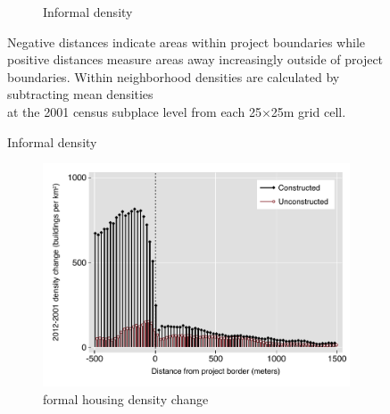 \documentclass[12pt]{article}
\begin{document}
\begin{figure}[h!]
\begin{subfigure}[b]{0.495\textwidth}
            \caption[]%
            {{\small Informal density}}    
            \label{fig:preinf_raw}
        \end{subfigure}
        \label{fig:rawbblumeans_het}
   {\scriptsize Negative distances indicate areas within project boundaries while positive distances measure areas away increasingly outside of project boundaries.  Within neighborhood densities are calculated by subtracting mean densities  \\[-.5em] at the 2001 census subplace level from each 25$\times$25m grid cell.}
    \end{figure} 



\begin{figure}[h!]
        \centering
        \caption[ Changes in Housing Densities in Constructed and Unconstructed Projects Areas]
        {\small Changes in Housing Densities in Constructed and Unconstructed projects } 
        \begin{subfigure}[b]{0.495\textwidth}   
            \centering 
            \includegraphics[width=\textwidth,trim={0.3cm .3cm 0.1cm 0cm}, clip=true]{figures/bblu_for_rawchanges_4_spk}
            \caption[]%
            {{\small formal housing density change}}    
            \label{fig:forchange}
        \end{subfigure}
        \hfill
        \begin{subfigure}[b]{0.495\textwidth}   
            \centering 

\end{subfigure}
\end{figure}
\end{document}

